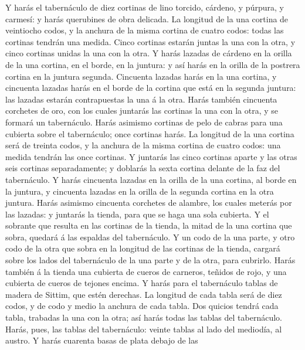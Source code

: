 Y harás el tabernáculo de diez cortinas de lino torcido,
cárdeno, y púrpura, y carmesí: y harás querubines de obra delicada.
 La longitud de la una cortina de veintiocho codos, y la
anchura de la misma cortina de cuatro codos: todas las cortinas tendrán
una medida.  Cinco cortinas estarán juntas la una con la
otra, y cinco cortinas unidas la una con la otra.  Y harás
lazadas de cárdeno en la orilla de la una cortina, en el borde, en la
juntura: y así harás en la orilla de la postrera cortina en la juntura
segunda.  Cincuenta lazadas harás en la una cortina, y
cincuenta lazadas harás en el borde de la cortina que está en la segunda
juntura: las lazadas estarán contrapuestas la una á la otra.
 Harás también cincuenta corchetes de oro, con los cuales
juntarás las cortinas la una con la otra, y se formará un tabernáculo.
 Harás asimismo cortinas de pelo de cabras para una
cubierta sobre el tabernáculo; once cortinas harás.  La
longitud de la una cortina será de treinta codos, y la anchura de la
misma cortina de cuatro codos: una medida tendrán las once cortinas.
 Y juntarás las cinco cortinas aparte y las otras seis
cortinas separadamente; y doblarás la sexta cortina delante de la faz
del tabernáculo.  Y harás cincuenta lazadas en la orilla
de la una cortina, al borde en la juntura, y cincuenta lazadas en la
orilla de la segunda cortina en la otra juntura.  Harás
asimismo cincuenta corchetes de alambre, los cuales meterás por las
lazadas: y juntarás la tienda, para que se haga una sola cubierta.
 Y el sobrante que resulta en las cortinas de la tienda,
la mitad de la una cortina que sobra, quedará á las espaldas del
tabernáculo.  Y un codo de la una parte, y otro codo de
la otra que sobra en la longitud de las cortinas de la tienda, cargará
sobre los lados del tabernáculo de la una parte y de la otra, para
cubrirlo.  Harás también á la tienda una cubierta de
cueros de carneros, teñidos de rojo, y una cubierta de cueros de tejones
encima.  Y harás para el tabernáculo tablas de madera de
Sittim, que estén derechas.  La longitud de cada tabla
será de diez codos, y de codo y medio la anchura de cada tabla.
 Dos quicios tendrá cada tabla, trabadas la una con la
otra; así harás todas las tablas del tabernáculo.  Harás,
pues, las tablas del tabernáculo: veinte tablas al lado del mediodía, al
austro.  Y harás cuarenta basas de plata debajo de las
